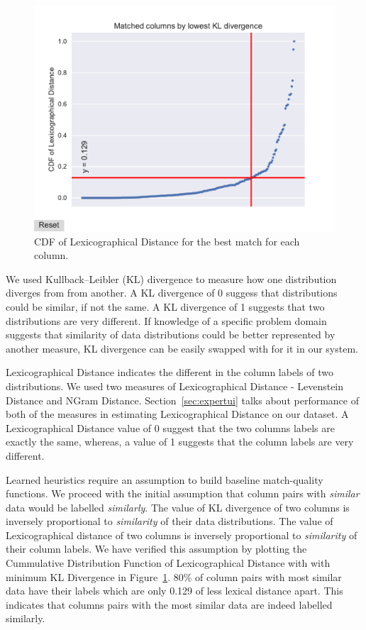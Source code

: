 \begin{figure}
	\centering
	\includegraphics[trim={0 6mm 0 0},clip,width=1\columnwidth]{graphics/CDF_LexDistance}
	\caption{CDF of Lexicographical Distance for the best match for each column.}
	\label{fig:cdflexdist}
	\trimfigurespacing
\end{figure}

We used Kullback–Leibler (KL) divergence to measure how one distribution diverges from from another. A KL divergence of 0 suggess that distributions could be similar, if not the same. A KL divergence of 1 suggests that two distributions are very different. If knowledge of a specific problem domain suggests that similarity of data distributions could be better represented by another measure, KL divergence can be easily swapped with for it in our system.  

Lexicographical Distance indicates the different in the column labels of two distributions. We used two measures of Lexicographical Distance - Levenstein Distance and NGram Distance. Section~\ref{sec:expertui} talks about performance of both of the measures in estimating Lexicographical Distance on our dataset. A Lexicographical Distance value of 0 suggest that the two columns labels are exactly the same, whereas, a value of 1 suggests that the column labels are very different.

Learned heuristics require an assumption to build baseline match-quality functions. We proceed with the initial assumption that column pairs with \textit{similar} data would be labelled \textit{similarly}. The value of KL divergence of two columns is inversely proportional to \textit{similarity} of their data distributions. The value of Lexicographical distance of two columns is inversely proportional to \textit{similarity} of their column labels. We have verified this assumption by plotting the Cummulative Distribution Function of Lexicographical Distance with with minimum KL Divergence in Figure~\ref{fig:cdflexdist}. 80\% of column pairs with most similar data have their labels which are only 0.129 of less lexical distance apart. This indicates that columns pairs with the most similar data are indeed labelled similarly. 
 
